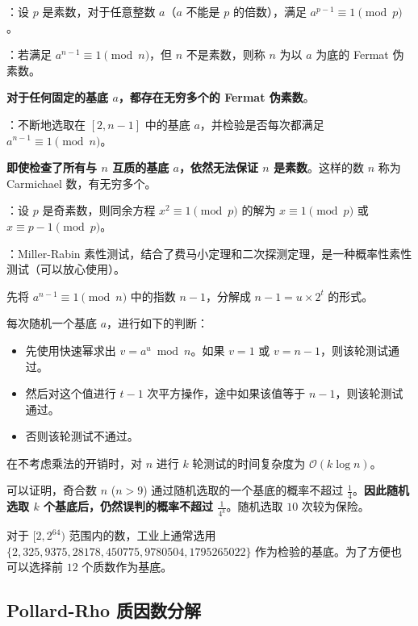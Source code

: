 ：设 $p$ 是素数，对于任意整数 $a$（$a$ 不能是 $p$ 的倍数），满足 $a^{p - 1} \equiv 1 \pmod p$。

：若满足 $a^{n - 1} \equiv 1 \pmod n$，但 $n$ 不是素数，则称 $n$ 为以 $a$ 为底的 Fermat 伪素数。

\textbf{对于任何固定的基底 $a$，都存在无穷多个的 Fermat 伪素数}。

：不断地选取在 $[2, n - 1]$ 中的基底 $a$，并检验是否每次都满足 $a^{n - 1} \equiv 1\pmod n$。

\textbf{即使检查了所有与 $n$ 互质的基底 $a$，依然无法保证 $n$ 是素数}。这样的数 $n$ 称为 Carmichael 数，有无穷多个。

：设 $p$ 是奇素数，则同余方程 $x^2 \equiv 1 \pmod p$ 的解为 $x \equiv 1 \pmod p$ 或 $x \equiv p - 1\pmod p$。

\Separator{}

：Miller-Rabin 素性测试，结合了费马小定理和二次探测定理，是一种概率性素性测试（可以放心使用）。

先将 $a^{n - 1} \equiv 1 \pmod n$ 中的指数 $n - 1$，分解成 $n - 1 = u \times 2^t$ 的形式。

每次随机一个基底 $a$，进行如下的判断：

\begin{itemize}
    \item 先使用快速幂求出 $v = a^u \bmod n$。如果 $v = 1$ 或 $v = n - 1$，则该轮测试通过。
    \item 然后对这个值进行 $t - 1$ 次平方操作，途中如果该值等于 $n - 1$，则该轮测试通过。
    \item 否则该轮测试不通过。
\end{itemize}

在不考虑乘法的开销时，对 $n$ 进行 $k$ 轮测试的时间复杂度为 $\mathcal{O}(k \log n)$。

可以证明，奇合数 $n$ ($n > 9$) 通过随机选取的一个基底的概率不超过 $\frac{1}{4}$。\textbf{因此随机选取 $k$ 个基底后，仍然误判的概率不超过 $\frac{1}{4^k}$}。随机选取 $10$ 次较为保险。

对于 $[2, 2^{64})$ 范围内的数，工业上通常选用 $\{ 2, 325, 9375, 28178, 450775, 9780504, 1795265022 \}$ 作为检验的基底。为了方便也可以选择前 $12$ 个质数作为基底。

\subsection{Pollard-Rho 质因数分解}

